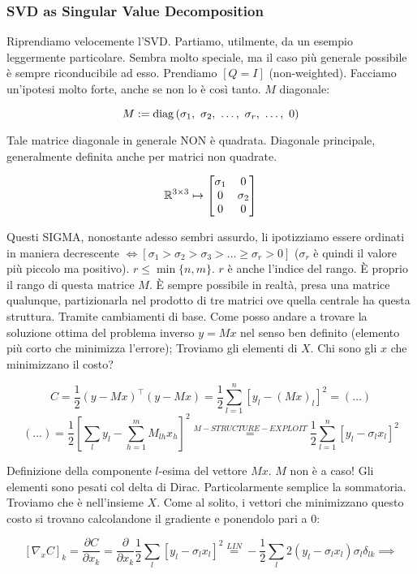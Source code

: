 \subsubsection{SVD as Singular Value Decomposition}

Riprendiamo velocemente l'SVD. Partiamo, utilmente, da un esempio leggermente particolare. Sembra molto speciale, ma il caso più generale possibile è sempre riconducibile ad esso. Prendiamo $[Q=I]$ (non-weighted). Facciamo un'ipotesi molto forte, anche se non lo è così tanto. $M$ diagonale:

\[
	M := \diag{(\sigma_1,\ \sigma_2,\ \dots,\ \sigma_r,\ \dots,\ 0)}
\]

Tale matrice diagonale in generale NON è quadrata. Diagonale principale, generalmente definita anche per matrici non quadrate. 

\[
	\mathbb{R}^{3\times 3} \mapsto \begin{bmatrix}\sigma_1&0\\0&\sigma_2\\0&0\end{bmatrix}
\]

Questi SIGMA, nonostante adesso sembri assurdo, li ipotizziamo essere ordinati in maniera decrescente $\iff [\sigma_1>\sigma_2>\sigma_3>\dots\geq\sigma_r>0]$ ($\sigma_r$ è quindi il valore più piccolo ma positivo). $r\leq\min\{n,m\}$. $r$ è anche l'indice del rango. \`E proprio il rango di questa matrice $M$. \`E sempre possibile in realtà, presa una matrice qualunque, partizionarla nel prodotto di tre matrici ove quella centrale ha questa struttura. Tramite cambiamenti di base. Come posso andare a trovare la soluzione ottima del problema inverso $y=Mx$ nel senso ben definito (elemento più corto che minimizza l'errore); Troviamo gli elementi di $X$. Chi sono gli $x$ che minimizzano il costo?

\[
	C = \frac{1}{2}(y-Mx)^\top(y-Mx) = \frac{1}{2}\sum_{l=1}^n{[y_l-(Mx)_l]^2} = (\dots)
\]
\[
	(\dots) = \frac{1}{2}[\sum_l{y_l-\sum_{h=1}^m{M_{lh}x_h}}]^2 \stackrel{M-STRUCTURE-EXPLOIT}{=} \frac{1}{2}\sum_{l=1}^n{[y_l-\sigma_lx_l]^2}
\]

Definizione della componente $l$-esima del vettore $Mx$. $M$ non è a caso! Gli elementi sono pesati col delta di Dirac. Particolarmente semplice la sommatoria. Troviamo che è nell'insieme $X$. Come al solito, i vettori che minimizzano questo costo si trovano calcolandone il gradiente e ponendolo pari a 0:

\[
	[\nabla_x{C}]_k = \frac{\partial C}{\partial x_k} = \frac{\partial}{\partial x_k}\frac{1}{2}\sum_l[y_l-\sigma_lx_l]^2 \stackrel{LIN}{=} -\frac{1}{2}\sum_l{2(y_l-\sigma_lx_l)}\sigma_l\delta_{lk} \implies
\]

